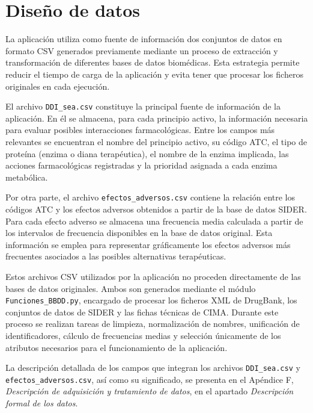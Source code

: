 \section{Diseño de datos}
La aplicación utiliza como fuente de información dos conjuntos de datos en formato CSV generados previamente 
mediante un proceso de extracción y transformación de diferentes bases de datos biomédicas. Esta estrategia 
permite reducir el tiempo de carga de la aplicación y evita tener que procesar los ficheros originales en cada 
ejecución.

El archivo \texttt{DDI\_sea.csv} constituye la principal fuente de información de la aplicación. En él se almacena, 
para cada principio activo, la información necesaria para evaluar posibles interacciones farmacológicas. 
Entre los campos más relevantes se encuentran el nombre del principio activo, su código ATC, el tipo de proteína 
(enzima o diana terapéutica), el nombre de la enzima implicada, las acciones farmacológicas registradas y la 
prioridad asignada a cada enzima metabólica.

Por otra parte, el archivo \texttt{efectos\_adversos.csv} contiene la relación entre los códigos ATC y los efectos 
adversos obtenidos a partir de la base de datos SIDER. Para cada efecto adverso se almacena una frecuencia media 
calculada a partir de los intervalos de frecuencia disponibles en la base de datos original. Esta información se 
emplea para representar gráficamente los efectos adversos más frecuentes asociados a las posibles alternativas 
terapéuticas.

Estos archivos CSV utilizados por la aplicación no proceden directamente de las bases de datos originales. 
Ambos son generados mediante el módulo \texttt{Funciones\_BBDD.py}, encargado de procesar los ficheros XML 
de DrugBank, los conjuntos de datos de SIDER y las fichas técnicas de CIMA. Durante este proceso se 
realizan tareas de limpieza, normalización de nombres, unificación de identificadores, cálculo de frecuencias 
medias y selección únicamente de los atributos necesarios para el funcionamiento de la aplicación.

La descripción detallada de los campos que integran los archivos \texttt{DDI\_sea.csv} y 
\texttt{efectos\_adversos.csv}, así como su significado, se presenta en el Apéndice F, 
\textit{Descripción de adquisición y tratamiento de datos}, en el apartado \textit{Descripción formal de los datos}.